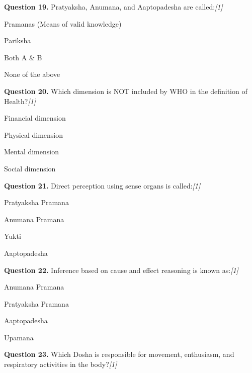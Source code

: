 \documentclass[11pt,a4paper]{article}
\newcommand{\pts}[1]{\hfill   \textit{[#1]}}
\begin{document}
\noindent   \textbf{Question 19.} Pratyaksha, Anumana, and Aaptopadesha are called:\pts{1}

\begin{parts}
  \item Pramanas (Means of valid knowledge)
  \item Pariksha
  \item Both A \& B
  \item None of the above
\end{parts}

\medskip




\noindent   \textbf{Question 20.} Which dimension is NOT included by WHO in the definition of Health?\pts{1}

\begin{parts}
  \item Financial dimension
  \item Physical dimension
  \item Mental dimension
  \item Social dimension
\end{parts}

\medskip




\noindent   \textbf{Question 21.} Direct perception using sense organs is called:\pts{1}

\begin{parts}
  \item Pratyaksha Pramana
  \item Anumana Pramana
  \item Yukti
  \item Aaptopadesha
\end{parts}

\medskip




\noindent   \textbf{Question 22.} Inference based on cause and effect reasoning is known as:\pts{1}

\begin{parts}
  \item Anumana Pramana
  \item Pratyaksha Pramana
  \item Aaptopadesha
  \item Upamana
\end{parts}

\medskip




\noindent   \textbf{Question 23.} Which Dosha is responsible for movement, enthusiasm, and respiratory activities in the body?\pts{1}
\end{document}
